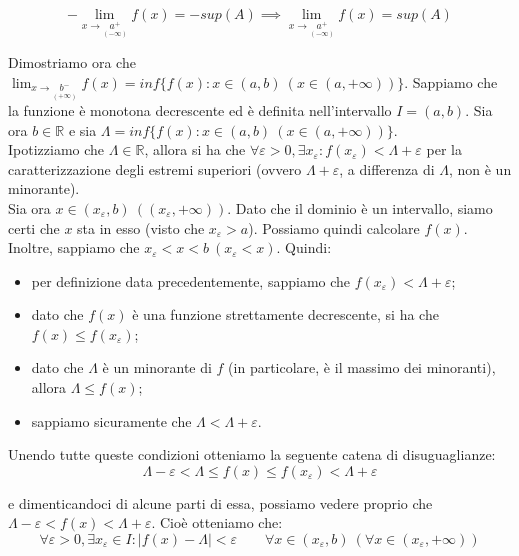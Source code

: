 \documentclass{article}
\begin{document}
\begin{equation*}
    - \lim_{x \to \underset{\scriptstyle (-\infty)}{a^+}} f(x) = - sup(A) \implies \lim_{x \to \underset{\scriptstyle (-\infty)}{a^+}} f(x) = sup(A)
\end{equation*}

\noindent Dimostriamo ora che $\lim_{x \to \underset{\scriptstyle (+\infty)}{b^-}} f(x) = inf\{f(x) : x \in (a, b) \ (x \in (a, +\infty))\}$. Sappiamo che la funzione è monotona decrescente ed è definita nell'intervallo $I = (a, b)$. Sia ora $b \in \mathbb{R}$ e sia $\Lambda = inf\{f(x) : x \in (a, b) \ (x \in (a, +\infty))\}$.\\
Ipotizziamo che $\Lambda \in \mathbb{R}$, allora si ha che $\forall \varepsilon > 0, \exists x_\varepsilon : f(x_\varepsilon) < \Lambda + \varepsilon$ per la caratterizzazione degli estremi superiori (ovvero $\Lambda + \varepsilon$, a differenza di $\Lambda$, non è un minorante). \\
Sia ora $x \in (x_\varepsilon, b) \ ((x_\varepsilon, +\infty))$. Dato che il dominio è un intervallo, siamo certi che $x$ sta in esso (visto che $x_\varepsilon > a$). Possiamo quindi calcolare $f(x)$. Inoltre, sappiamo che $x_\varepsilon < x < b \ (x_\varepsilon < x)$. Quindi:

\begin{itemize}
    \item per definizione data precedentemente, sappiamo che $f(x_\varepsilon) < \Lambda + \varepsilon$;
    \item dato che $f(x)$ è una funzione strettamente decrescente, si ha che $f(x) \leq f(x_\varepsilon)$;
    \item dato che $\Lambda$ è un minorante di $f$ (in particolare, è il massimo dei minoranti), allora $\Lambda \leq f(x)$;
    \item sappiamo sicuramente che $\Lambda < \Lambda + \varepsilon$.
\end{itemize}

\noindent Unendo tutte queste condizioni otteniamo la seguente catena di disuguaglianze:
\begin{equation*}
    \Lambda - \varepsilon < \Lambda \leq f(x) \leq f(x_\varepsilon) < \Lambda + \varepsilon
\end{equation*}

\noindent e dimenticandoci di alcune parti di essa, possiamo vedere proprio che $\Lambda - \varepsilon < f(x) < \Lambda + \varepsilon$. Cioè otteniamo che:
\begin{equation*}
    \forall \varepsilon > 0, \exists x_\varepsilon \in I : |f(x) - \Lambda| < \varepsilon \qquad \forall x \in (x_\varepsilon, b) \ (\forall x \in (x_\varepsilon, +\infty))
\end{equation*}
\end{document}
